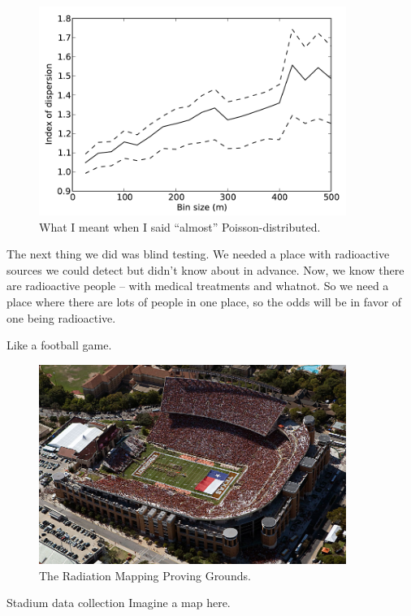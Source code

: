 \documentclass[ignorenonframetext]{beamer}
\begin{document}
\begin{frame}
  \begin{figure}
    \includegraphics[width=100mm]{figures/poisson-dispersion.pdf}
    \caption{What I meant when I said ``almost'' Poisson-distributed.}
  \end{figure}
\end{frame}

The next thing we did was blind testing. We needed a place with radioactive
sources we could detect but didn't know about in advance. Now, we know there are
radioactive people -- with medical treatments and whatnot. So we need a place
where there are lots of people in one place, so the odds will be in favor of one
being radioactive.

Like a football game.

\begin{frame}
  \begin{figure}
    \includegraphics[width=100mm]{figures/talk-stadium.jpg}
    \caption{The Radiation Mapping Proving Grounds.}
  \end{figure}
\end{frame}

\begin{frame}{Stadium data collection}
  Imagine a map here.
\end{frame}
\end{document}

